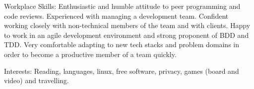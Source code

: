 
\inlineheadsection 
{Workplace Skills:} {Enthusiastic and humble attitude to peer programming and code reviews. Experienced  with managing a development team. Confident working closely with non-technical members of the team and with clients. Happy to work in an agile development environment and strong proponent of BDD and TDD. Very comfortable adapting to new tech stacks and problem domains in order to become a productive member of a team quickly.}

\inlineheadsection 
{Interests:} {Reading, languages, linux, free software, privacy, games (board and video) and travelling.}
